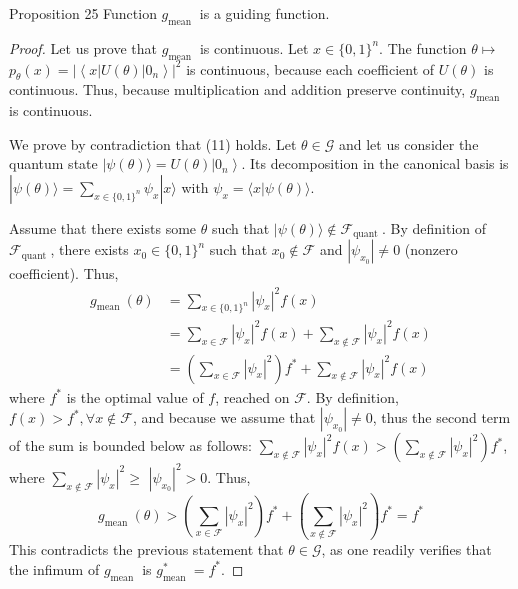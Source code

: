 \begin{proposition}
    Proposition 25 Function $g_{\text {mean }}$ is a guiding function.
\end{proposition}

\begin{proof}
Let us prove that $g_{\text {mean }}$ is continuous.
Let $x \in\{0,1\}^{n}$. The function $\theta \mapsto$ $p_{\theta}(x)=\left|\left\langle x|U(\theta)| 0_{n}\right\rangle\right|^{2}$ is continuous, because each coefficient of $U(\theta)$ is continuous. Thus, because multiplication and addition preserve continuity, $g_{\text {mean }}$ is continuous.

We prove by contradiction that (11) holds.
Let $\theta \in \mathcal{G}$ and let us consider the quantum state $|\psi(\theta)\rangle=U(\theta)\left|0_{n}\right\rangle$. Its decomposition in the canonical basis is $|\psi(\theta)\rangle=\sum_{x \in\{0,1\}^{n}} \psi_{x}|x\rangle$ with $\psi_{x}=\langle x|\psi(\theta)\rangle$. %

Assume that there exists some $\theta$ such that $|\psi(\theta)\rangle \notin \mathcal{F}_{\text {quant }}$. By definition of $\mathcal{F}_{\text {quant }}$, there exists $x_{0} \in\{0,1\}^{n}$ such that $x_{0} \notin \mathcal{F}$ and $\left|\psi_{x_{0}}\right| \neq 0$ (nonzero coefficient). Thus,
$$
\begin{aligned}
g_{\text {mean }}(\theta) & =\sum_{x \in\{0,1\}^{n}}\left|\psi_{x}\right|^{2} f(x) \\
& =\sum_{x \in \mathcal{F}}\left|\psi_{x}\right|^{2} f(x)+\sum_{x \notin \mathcal{F}}\left|\psi_{x}\right|^{2} f(x) \\
& =\left(\sum_{x \in \mathcal{F}}\left|\psi_{x}\right|^{2}\right) f^{*}+\sum_{x \notin \mathcal{F}}\left|\psi_{x}\right|^{2} f(x)
\end{aligned}
$$
where $f^{*}$ is the optimal value of $f$, reached on $\mathcal{F}$. By definition, $f(x)>f^{*}, \forall x \notin \mathcal{F}$, and because we assume that $\left|\psi_{x_{0}}\right| \neq 0$, thus the second term of the sum is bounded below as follows: $\sum_{x \notin \mathcal{F}}\left|\psi_{x}\right|^{2} f(x)>\left(\sum_{x \notin \mathcal{F}}\left|\psi_{x}\right|^{2}\right) f^{*}$, where $\sum_{x \notin \mathcal{F}}\left|\psi_{x}\right|^{2} \geq$ $\left|\psi_{x_{0}}\right|^{2}>0$. Thus,
$$
g_{\text {mean }}(\theta)>\left(\sum_{x \in \mathcal{F}}\left|\psi_{x}\right|^{2}\right) f^{*}+\left(\sum_{x \notin \mathcal{F}}\left|\psi_{x}\right|^{2}\right) f^{*}=f^{*}
$$
This contradicts the previous statement that $\theta \in \mathcal{G}$, as one readily verifies that the infimum of $g_{\text {mean }}$ is $g_{\text {mean }}^{*}=f^{*}$.
\end{proof}


